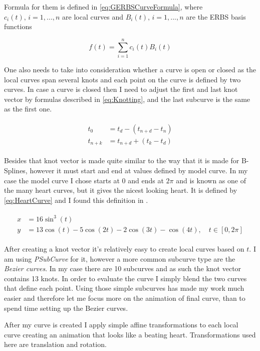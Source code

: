 \documentclass[a4paper,12pt]{extarticle}
\begin{document}
Formula for them is defined in \cref{eq:GERBSCurveFormula}, where $c_i(t), \, i=1,..., n$ are local curves and $B_i(t), \, i=1,..., n$ are the ERBS basis functions

\begin{equation}
f(t)= \sum_{i=1}^{n} c_i(t) B_i(t)
\label{eq:GERBSCurveFormula}
\end{equation}

One also needs to take into consideration whether a curve is open or closed as the local curves span several knots and each point on the curve is defined by two curves. In case a curve is closed then I need to adjust the first and last knot vector by formulas described in \cref{eq:Knotting}, and the last subcurve is the same as the first one.

\begin{align}
\begin{split}
t_0&=t_d-(t_{n+d}-t_n)\\
t_{n+k}&=t_{n+d}+(t_k-t_d)
\label{eq:Knotting}
\end{split}
\end{align}

Besides that knot vector is made quite similar to the way that it is made for B-Splines, however it must start and end at values defined by model curve. In my case the model curve I chose starts at $0$ and ends at $2\pi$ and is known as one of the many heart curves, but it gives the nicest looking heart. It is defined by \cref{eq:HeartCurve} and I found this definition in \citep{Weisstein2018}.

\begin{align}
\begin{split}
x &= 16 \sin^3(t) \\
y &= 13 \cos(t) - 5 \cos(2t) - 2 \cos(3t) - \cos(4t), \quad t \in [0,2\pi]
\label{eq:HeartCurve}
\end{split}
\end{align}

After creating a knot vector it's relatively easy to create local curves based on $t$. I am using \emph{PSubCurve} for it, however a more common subcurve type are the \emph{Bezier curves}. In my case there are 10 subcurves and as such the knot vector contains 13 knots. In order to evaluate the curve I simply blend the two curves that define each point. Using those simple subcurves has made my work much easier and therefore let me focus more on the animation of final curve, than to spend time setting up the Bezier curves.

After my curve is created I apply simple affine transformations to each local curve creating an animation that looks like a beating heart. Transformations used here are translation and rotation.
\end{document}

